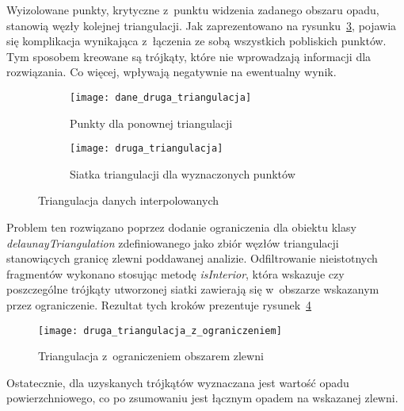 Wyizolowane punkty, krytyczne z~punktu widzenia zadanego obszaru opadu, stanowią węzły kolejnej triangulacji. Jak zaprezentowano na rysunku~\ref{fig:druga_triangulacja}, pojawia się komplikacja wynikająca z~łączenia ze sobą wszystkich pobliskich punktów. Tym sposobem kreowane są trójkąty, które nie wprowadzają informacji dla rozwiązania. Co więcej, wpływają negatywnie na ewentualny wynik.

\begin{figure}[!ht]
	\centering
\begin{subfigure}{1\textwidth}
	\centering
	\texttt{[image: dane\_druga\_triangulacja]}
	\caption{Punkty dla ponownej triangulacji}
	\label{fig:dane_druga_triangulacja}
\end{subfigure}	
	\begin{subfigure}{1\textwidth}
	\centering
	\texttt{[image: druga\_triangulacja]}
	\caption{Siatka triangulacji dla wyznaczonych punktów}
\label{fig:druga_triangulacja}	
\end{subfigure}	
\caption{Triangulacja danych interpolowanych}
\end{figure}

Problem ten rozwiązano poprzez dodanie ograniczenia dla obiektu klasy \textit{delaunayTriangulation} zdefiniowanego jako zbiór węzłów triangulacji stanowiących granicę zlewni poddawanej analizie. Odfiltrowanie nieistotnych fragmentów wykonano stosując metodę \textit{isInterior}, która wskazuje czy poszczególne trójkąty utworzonej siatki zawierają się w~obszarze wskazanym przez ograniczenie. Rezultat tych kroków prezentuje rysunek~\ref{fig:druga_triangulacja_ograniczenie}

\begin{figure}[!ht]
	\centering
	\texttt{[image: druga\_triangulacja\_z\_ograniczeniem]}
	\caption{Triangulacja z~ograniczeniem obszarem zlewni}
	\label{fig:druga_triangulacja_ograniczenie}
\end{figure}

Ostatecznie, dla uzyskanych trójkątów wyznaczana jest wartość opadu powierzchniowego, co po zsumowaniu jest łącznym opadem na wskazanej zlewni.